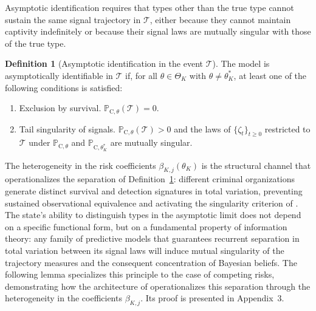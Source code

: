 \documentclass[ecta,nameyear,draft]{econsocart}
\theoremstyle{plain}
\theoremstyle{definition}
\newtheorem{definition}[theorem]{Definition}
\newcommand{\ProbC}[1]{\mathbb{P}_{\mathrm{C},#1}}
\newcommand{\ThetaK}{\Theta_K}
\newcommand{\1}{\mathbf{1}}
\begin{document}
Asymptotic identification requires that types other than the true type cannot sustain the same signal trajectory in $\mathcal{T}$, either because they cannot maintain captivity indefinitely or because their signal laws are mutually singular with those of the true type.

\begin{definition}[Asymptotic identification in the event $\mathcal{T}$]\label{def:asymptotic-id}
The model is asymptotically identifiable in $\mathcal{T}$ if, for all $\theta\in\ThetaK$ with $\theta\neq\theta_K^\ast$, at least one of the following conditions is satisfied:
\begin{enumerate}
  \item[\textup{(a)}] Exclusion by survival. $\ProbC{\theta}(\mathcal{T})=0$.
  \item[\textup{(b)}] Tail singularity of signals. $\ProbC{\theta}(\mathcal{T})>0$ and the laws of $\{\zeta_t\}_{t\ge 0}$ restricted to $\mathcal{T}$ under $\ProbC{\theta}$ and $\ProbC{\theta_K^\ast}$ are mutually singular.
\end{enumerate}
\end{definition}

The heterogeneity in the risk coefficients $\beta_{K,j}(\theta_K)$ is the structural channel that operationalizes the separation of Definition~\ref{def:asymptotic-id}: different criminal organizations generate distinct survival and detection signatures in total variation, preventing sustained observational equivalence and activating the singularity criterion of \citet{Kakutani1948}. The state's ability to distinguish types in the asymptotic limit does not depend on a specific functional form, but on a fundamental property of information theory: any family of predictive models that guarantees recurrent separation in total variation between its signal laws will induce mutual singularity of the trajectory measures and the consequent concentration of Bayesian beliefs. The following lemma specializes this principle to the case of competing risks, demonstrating how the architecture of \citet{Cox1972} operationalizes this separation through the heterogeneity in the coefficients $\beta_{K,j}$. Its proof is presented in Appendix~3.
\end{document}
